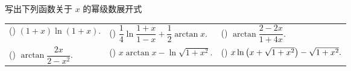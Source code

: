 \begin{example}
    写出下列函数关于 $x$ 的幂级数展开式
    \setcounter{magicrownumbers}{0}
    \begin{table}[H]
        \centering
        \begin{tabular}{l | l | l}
            (\rownumber{}) $(1+x)\ln(1+x).$            & (\rownumber{}) $\dfrac{1}{4}\ln\dfrac{1+x}{1-x}+\dfrac{1}{2}\arctan x.$ & (\rownumber{}) $\arctan\dfrac{2-2x}{1+4x}.$             \\
            (\rownumber{}) $\arctan\dfrac{2x}{2-x^2}.$ & (\rownumber{}) $x\arctan x-\ln\sqrt{1+x^2}.$                            & (\rownumber{}) $x\ln\qty(x+\sqrt{1+x^2})-\sqrt{1+x^2}.$
        \end{tabular}
    \end{table}
\end{example}
